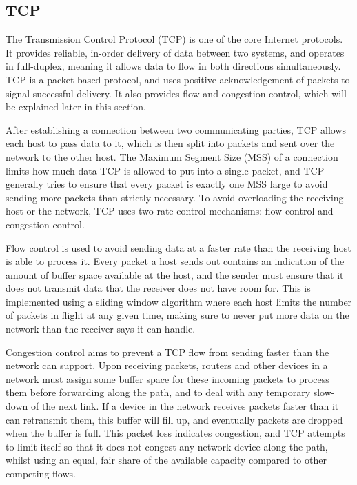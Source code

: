 \subsection{TCP}
\label{sec:bg:tcp}
The Transmission Control Protocol (TCP) is one of the core Internet protocols.
It provides reliable, in-order delivery of data between two
systems, and operates in full-duplex, meaning it allows data to flow
in both directions simultaneously. TCP is a packet-based
protocol, and uses positive acknowledgement of packets to signal successful
delivery. It also provides flow and congestion
control, which will be explained later in this section.

After establishing a connection between two communicating parties, TCP allows
each host to pass data to it, which is then split into packets and sent over the
network to the other host. The Maximum Segment Size (MSS) of a connection limits
how much data TCP is allowed to put into a single packet, and TCP generally
tries to ensure that every packet is exactly one MSS large to avoid sending
more packets than strictly necessary. To avoid overloading the receiving host or
the network, TCP uses two rate
control mechanisms: flow control and congestion control.

Flow control is used to
avoid sending data at a faster rate than the receiving host is able to process it.
Every packet a host sends out contains an indication of the amount of
buffer space available at the host, and the sender must ensure that it
does not transmit data that the receiver does not have room for. This is
implemented using a sliding window algorithm where each host limits the number
of packets in flight at any given time, making sure to never put more data on
the network than the receiver says it can handle.

Congestion control aims to prevent a TCP flow from sending faster than the
network can support. Upon receiving packets, routers and other devices in a
network must assign some buffer space for these incoming packets to process them
before forwarding along the path, and to deal with any temporary slow-down of the
next link. If a device in the network receives packets faster than it can
retransmit them, this buffer will fill up, and eventually packets are dropped
when the buffer is full. This packet loss indicates congestion, and TCP
attempts to limit itself so that it does not congest any network device along
the path, whilst using an equal, fair share of the available capacity compared
to other competing flows.

